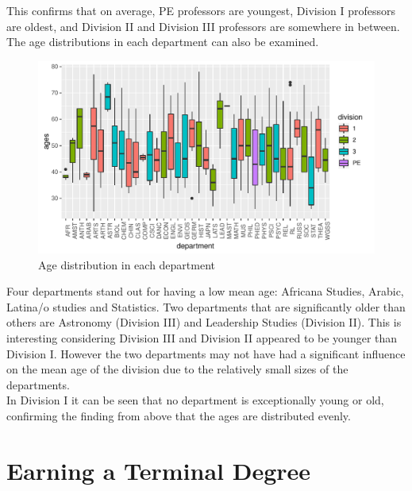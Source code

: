 \documentclass{article}\usepackage[]{graphicx}\usepackage[]{color}
\makeatletter
\def\maxwidth{ %
  \ifdim\Gin@nat@width>\linewidth
    \linewidth
  \else
    \Gin@nat@width
  \fi
}
\newenvironment{knitrout}{}{} %
\makeatother
\begin{document}
This confirms that on average, PE professors are youngest, Division I professors are oldest, and Division
II and Division III professors are somewhere in between.\\

The age distributions in each department can also be examined.

\begin{knitrout}
\color{fgcolor}\begin{figure}[h]
\includegraphics[width=\maxwidth]{figure/unnamed-chunk-6-1} \caption[Age distribution in each department]{Age distribution in each department}\label{fig:unnamed-chunk-6}
\end{figure}


\end{knitrout}

Four departments stand out for having a low mean age: Africana Studies, Arabic, Latina/o studies and
Statistics. Two departments that are significantly older than others are Astronomy (Division III) and
Leadership Studies (Division II). This is interesting considering Division III and Division II appeared
to be younger than Division I. However the two departments may not have had a significant influence on the
mean age of the division due to the relatively small sizes of the departments.\\

In Division I it can be seen that no department is exceptionally young or old, confirming the finding from
above that the ages are distributed evenly.

\section{Earning a Terminal Degree}
\end{document}
